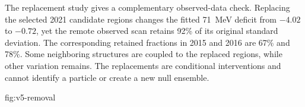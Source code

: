 The replacement study gives a complementary observed-data check. Replacing
the selected 2021 candidate regions changes the fitted 71~MeV deficit from
$-4.02$ to $-0.72$, yet the remote observed scan retains 92\% of its original
standard deviation. The corresponding retained fractions in 2015 and 2016
are 67\% and 78\%. Some neighboring structures are coupled to the replaced
regions, while other variation remains. The replacements are conditional
interventions and cannot identify a particle or create a new null ensemble.

{fig:v5-removal}
\FloatBarrier
